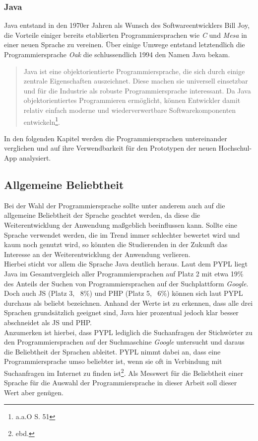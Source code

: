 \subsubsection*{Java} 

Java entstand in den 1970er Jahren als Wunsch des Softwareentwicklers Bill Joy, die Vorteile einiger bereits etablierten Programmiersprachen wie \textit{C} und \textit{Mesa} in einer neuen Sprache zu vereinen. Über einige Umwege entstand letztendlich die Programmiersprache \textit{Oak} die schlussendlich 1994 den Namen Java bekam\autocite[Vgl.][49\psq]{java}.

\begin{quote}
Java ist eine objektorientierte Programmiersprache, die sich durch einige zentrale Eigenschaften auszeichnet. Diese machen sie universell einsetzbar und für die Industrie als robuste Programmiersprache interessant. Da Java objektorientiertes Programmieren ermöglicht, können Entwickler damit relativ einfach moderne und wiederverwertbare Softwarekomponenten entwickeln\footnote{a.a.O S. 51}.
\end{quote}

In den folgenden Kapitel werden die Programmiersprachen untereinander verglichen und auf ihre Verwendbarkeit für den Prototypen der neuen Hochschul-\ac{App} analysiert.

\subsection*{Allgemeine Beliebtheit} 

Bei der Wahl der Programmiersprache sollte unter anderem auch auf die allgemeine Beliebtheit der Sprache geachtet werden, da diese die Weiterentwicklung der Anwendung maßgeblich beeinflussen kann. Sollte eine Sprache verwendet werden, die im Trend immer schlechter bewertet wird und kaum noch genutzt wird, so könnten die Studierenden in der Zukunft das Interesse an der Weiterentwicklung der Anwendung verlieren.\\
\linebreak
Hierbei sticht vor allem die Sprache Java deutlich heraus. Laut dem \ac{PYPL} liegt Java im Gesamtvergleich aller Programmiersprachen auf Platz 2 mit etwa 19\% des Anteils der Suchen von Programmiersprachen auf der Suchplattform \textit{Google}. Doch auch \ac{JS} (Platz 3, ~8\%) und \ac{PHP} (Platz 5, ~6\%) können sich laut \ac{PYPL} durchaus als beliebt bezeichnen\autocite[][]{pypl}. Anhand der Werte ist zu erkennen, dass alle drei Sprachen grundsätzlich geeignet sind, Java hier prozentual jedoch klar besser abschneidet als \ac{JS} und \ac{PHP}.\\
\linebreak
Anzumerken ist hierbei, dass \ac{PYPL} lediglich die Suchanfragen der Stichwörter zu den Programmiersprachen auf der Suchmaschine \textit{Google} untersucht und daraus die Beliebtheit der Sprachen ableitet. \ac{PYPL} nimmt dabei an, dass eine Programmiersprache umso beliebter ist, wenn sie oft in Verbindung mit Suchanfragen im Internet zu finden ist\footnote{ebd.}. Als Messwert für die Beliebtheit einer Sprache für die Auswahl der Programmiersprache in dieser Arbeit soll dieser Wert aber genügen.

